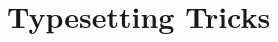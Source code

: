 \documentclass[11pt]{article} %
\theoremstyle{definition}
\theoremstyle{remark}
\begin{document}

\part{Typesetting Tricks}
\end{document}
